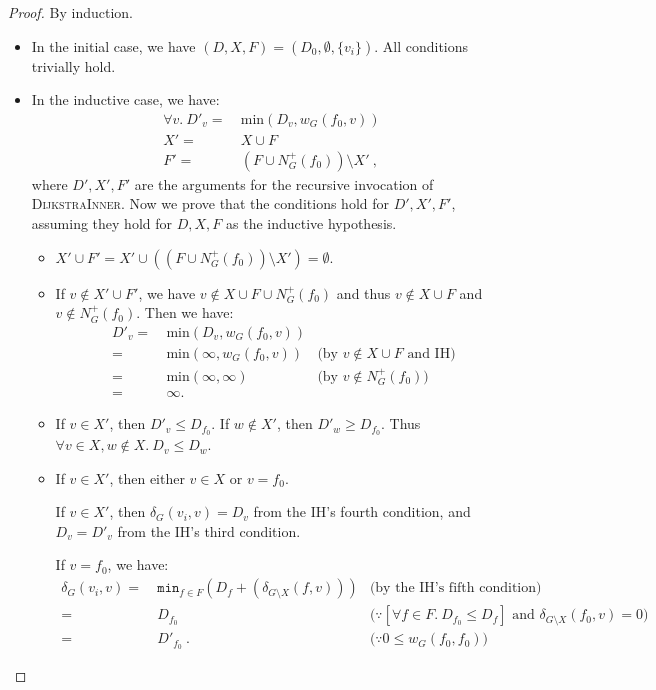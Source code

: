 \documentclass[11pt,a4paper,oneside,microtype,nokorean]{oblivoir}
\begin{document}
\begin{proof}
  By induction.

  \begin{itemize}
  \item In the initial case, we have $(D, X, F) = (D_0, \emptyset, \{v_i\})$.  All conditions trivially hold.
  \item In the inductive case, we have:
    \begin{align*}
      \forall v.~D'_v =&~ \textrm{min}(D_v, w_G(f_0,v)) \\
      X' =&~ X \cup F \\
      F' =&~ (F \cup N^+_G(f_0)) \setminus X'~,
    \end{align*}
    where $D', X', F'$ are the arguments for the recursive invocation of \textsc{DijkstraInner}.
    Now we prove that the conditions hold for $D', X', F'$, assuming they hold for $D, X, F$ as the
    inductive hypothesis.

    \begin{itemize}
    \item $X' \cup F' = X' \cup ((F \cup N^+_G(f_0)) \setminus X') = \emptyset$.

    \item If $v \notin X' \cup F'$, we have $v \notin X \cup F \cup N^+_G(f_0)$ and thus
      $v \notin X \cup F$ and $v \notin N^+_G(f_0)$.  Then we have:
      \begin{align*}
        D'_v
        =&~ \textrm{min}(D_v, w_G(f_0,v)) \\
        =&~ \textrm{min}(\infty, w_G(f_0,v)) & \mbox{(by $v \notin X \cup F$ and IH)} \\
        =&~ \textrm{min}(\infty, \infty) & \mbox{(by $v \notin N^+_G(f_0)$)} \\
        =&~ \infty.
      \end{align*}

    \item If $v \in X'$, then $D'_v \le D_{f_0}$.  If $w \notin X'$, then $D'_w \ge D_{f_0}$.  Thus
      $\forall v\in X, w \notin X.~D_v \le D_w$.

    \item If $v \in X'$, then either $v \in X$ or $v = f_0$.

      If $v \in X'$, then $\delta_G(v_i,v) = D_v$ from the IH's fourth condition, and $D_v = D'_v$
      from the IH's third condition.

      If $v = f_0$, we have:
      \begin{align*}
        \delta_G(v_i,v) =&~ \texttt{min}_{f \in F} (D_f + (\delta_{G \setminus X}(f,v))) & \mbox{(by the IH's
                                                                                           fifth condition)} \\
        =&~ D_{f_0} & \mbox{($\because [\forall f \in F.~D_{f_0} \le D_f]$ and
                      $\delta_{G \setminus X}(f_0,v) = 0$)} \\
        =&~ D'_{f_0}~. & \mbox{($\because 0 \le w_G(f_0,f_0)$)}
      \end{align*}


\end{itemize}
\end{itemize}
\end{proof}
\end{document}
